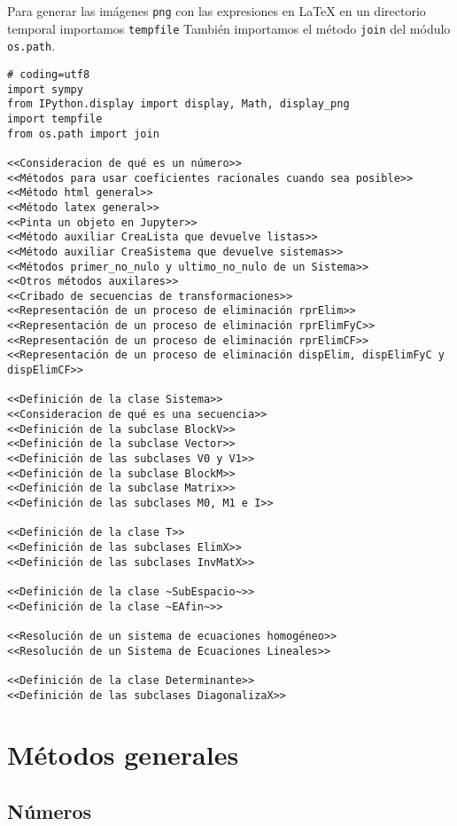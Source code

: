 \documentclass[11pt]{report}
\begin{document}
Para generar las imágenes \texttt{png} con las expresiones en \LaTeX{} en un
directorio temporal importamos \texttt{tempfile}
También importamos el método \texttt{join} del módulo \texttt{os.path}.
\begin{verbatim}
# coding=utf8
import sympy
from IPython.display import display, Math, display_png
import tempfile
from os.path import join           

<<Consideracion de qué es un número>>
<<Métodos para usar coeficientes racionales cuando sea posible>>
<<Método html general>>
<<Método latex general>>
<<Pinta un objeto en Jupyter>>
<<Método auxiliar CreaLista que devuelve listas>>
<<Método auxiliar CreaSistema que devuelve sistemas>>
<<Métodos primer_no_nulo y ultimo_no_nulo de un Sistema>>
<<Otros métodos auxilares>>
<<Cribado de secuencias de transformaciones>>
<<Representación de un proceso de eliminación rprElim>>
<<Representación de un proceso de eliminación rprElimFyC>>
<<Representación de un proceso de eliminación rprElimCF>>
<<Representación de un proceso de eliminación dispElim, dispElimFyC y dispElimCF>>

<<Definición de la clase Sistema>>
<<Consideracion de qué es una secuencia>>
<<Definición de la subclase BlockV>>
<<Definición de la subclase Vector>>
<<Definición de las subclases V0 y V1>>
<<Definición de la subclase BlockM>>
<<Definición de la subclase Matrix>>
<<Definición de las subclases M0, M1 e I>>

<<Definición de la clase T>>
<<Definición de las subclases ElimX>>
<<Definición de las subclases InvMatX>>

<<Definición de la clase ~SubEspacio~>>
<<Definición de la clase ~EAfin~>>

<<Resolución de un sistema de ecuaciones homogéneo>>
<<Resolución de un Sistema de Ecuaciones Lineales>>

<<Definición de la clase Determinante>>
<<Definición de las subclases DiagonalizaX>>
\end{verbatim}


\chapter{Métodos generales}
\label{sec:org191c89b}

\section{Números}
\label{sec:orgeee62cd}
\end{document}

